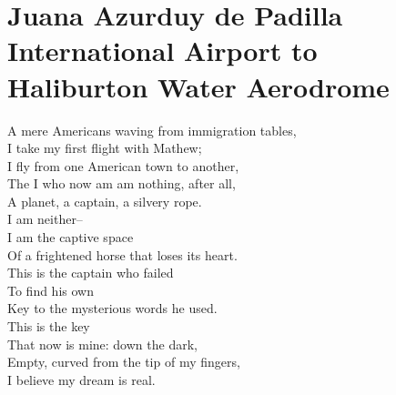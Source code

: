 \documentclass[smalldemyvopaper,11pt,twoside,onecolumn,openright,extrafontsizes]{memoir}
\begin{document}
\chapter{Juana Azurduy de Padilla International Airport to Haliburton Water Aerodrome}
A mere Americans waving from immigration tables,
\\I take my first flight with Mathew;
\\I fly from one American town to another,
\\The I who now am am nothing, after all,
\\A planet, a captain, a silvery rope.
\\I am neither--
\\I am the captive space
\\Of a frightened horse that loses its heart.
\\This is the captain who failed
\\To find his own
\\Key to the mysterious words he used.
\\This is the key
\\That now is mine: down the dark,
\\Empty, curved from the tip of my fingers,
\\I believe my dream is real.
\end{document}
